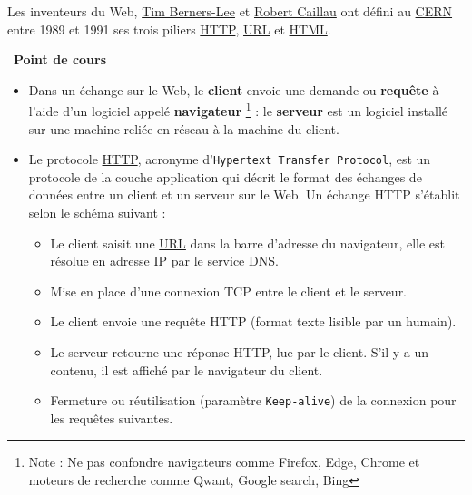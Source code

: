 \documentclass[
  11pt,
]{article}
\newcommand{\passthrough}[1]{#1}
\providecommand{\tightlist}{%
  \setlength{\itemsep}{0pt}\setlength{\parskip}{0pt}}
\newcounter{cours}
\newenvironment{cours}[1]
{\par \medskip   \addtocounter{cours}{1} \noindent  
\begin{bclogo}[arrondi =0.1,  ombre = true, barre=none, logo=\bcbook, marge=4]{~\textbf{Point de cours} \textbf{\thecours} {\itshape #1} }  \par}
{
\end{bclogo}
 \par \bigskip }
\newcounter{logi}
\begin{document}
Les inventeurs du Web,
\href{https://interstices.info/les-debuts-du-web-sous-loeil-du-w3c/}{Tim
Berners-Lee} et
\href{https://fr.wikipedia.org/wiki/Robert_Cailliau}{Robert Caillau} ont
défini au
\href{https://fr.wikipedia.org/wiki/Organisation_europ\%C3\%A9enne_pour_la_recherche_nucl\%C3\%A9aire}{CERN}
entre 1989 et 1991 ses trois piliers
\href{https://developer.mozilla.org/fr/docs/Glossaire/HTTP}{HTTP},
\url{URL} et \url{HTML}.

\begin{cours}{}

\begin{itemize}
\tightlist
\item
  Dans un échange sur le Web, le \textbf{client} envoie une demande ou
  \textbf{requête} à l'aide d'un logiciel appelé \textbf{navigateur}
  \footnote{Note : Ne pas confondre navigateurs comme Firefox, Edge,
    Chrome et moteurs de recherche comme Qwant, Google search, Bing} :
  le \textbf{serveur} est un logiciel installé sur une machine reliée en
  réseau à la machine du client.
\item
  Le protocole
  \href{https://developer.mozilla.org/fr/docs/Glossaire/HTTP}{HTTP},
  acronyme d'\passthrough{\lstinline!Hypertext Transfer Protocol!}, est
  un protocole de la couche application qui décrit le format des
  échanges de données entre un client et un serveur sur le Web. Un
  échange HTTP s'établit selon le schéma suivant :

  \begin{itemize}
  \tightlist
  \item
    Le client saisit une
    \href{https://developer.mozilla.org/fr/docs/Glossaire/URL}{URL} dans
    la barre d'adresse du navigateur, elle est résolue en adresse
    \href{https://developer.mozilla.org/fr/docs/Glossaire/IP_Address}{IP}
    par le service
    \href{https://developer.mozilla.org/fr/docs/Glossaire/DNS}{DNS}.
  \item
    Mise en place d'une connexion TCP entre le client et le serveur.
  \item
    Le client envoie une requête HTTP (format texte lisible par un
    humain).
  \item
    Le serveur retourne une réponse HTTP, lue par le client. S'il y a un
    contenu, il est affiché par le navigateur du client.
  \item
    Fermeture ou réutilisation (paramètre
    \passthrough{\lstinline!Keep-alive!}) de la connexion pour les
    requêtes suivantes.
  \end{itemize}
\end{itemize}


\end{cours}
\end{document}
